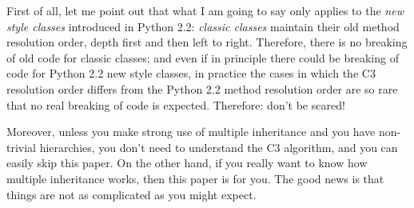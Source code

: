 \documentclass[10pt,english]{article}
\begin{document}
First of all, let me point out that what I am going to say only applies
to the \emph{new style classes} introduced in Python 2.2:  \emph{classic classes}
maintain their old method resolution order, depth first and then left to
right.  Therefore, there is no breaking of old code for classic classes;
and even if in principle there could be breaking of code for Python 2.2
new style classes, in practice the cases in which the C3 resolution
order differs from the Python 2.2 method resolution order are so rare
that no real breaking of code is expected.  Therefore: don't be scared!

Moreover, unless you make strong use of multiple inheritance and you
have non-trivial hierarchies, you don't need to understand the C3
algorithm, and you can easily skip this paper.  On the other hand, if
you really want to know how multiple inheritance works, then this paper
is for you.  The good news is that things are not as complicated as you
might expect.
\end{document}
